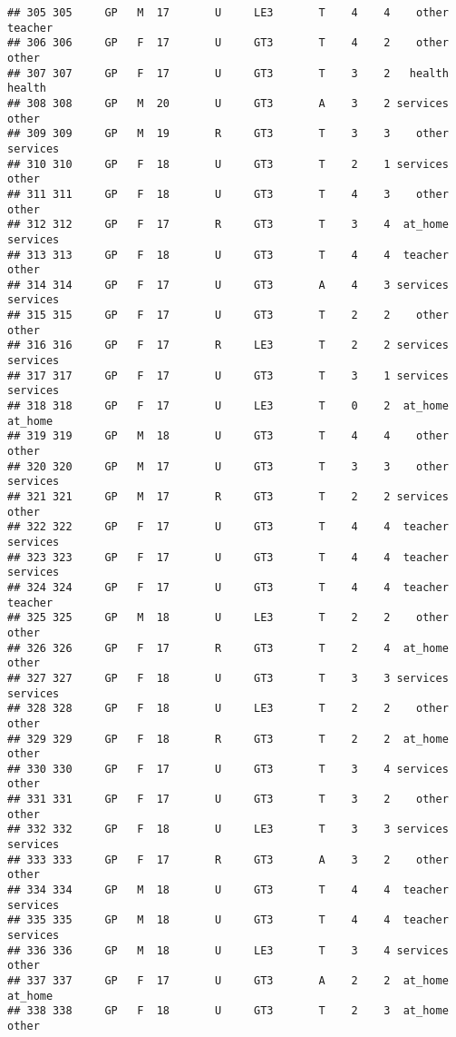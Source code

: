 \documentclass[]{article}
\begin{document}
\begin{verbatim}
## 305 305     GP   M  17       U     LE3       T    4    4    other  teacher
## 306 306     GP   F  17       U     GT3       T    4    2    other    other
## 307 307     GP   F  17       U     GT3       T    3    2   health   health
## 308 308     GP   M  20       U     GT3       A    3    2 services    other
## 309 309     GP   M  19       R     GT3       T    3    3    other services
## 310 310     GP   F  18       U     GT3       T    2    1 services    other
## 311 311     GP   F  18       U     GT3       T    4    3    other    other
## 312 312     GP   F  17       R     GT3       T    3    4  at_home services
## 313 313     GP   F  18       U     GT3       T    4    4  teacher    other
## 314 314     GP   F  17       U     GT3       A    4    3 services services
## 315 315     GP   F  17       U     GT3       T    2    2    other    other
## 316 316     GP   F  17       R     LE3       T    2    2 services services
## 317 317     GP   F  17       U     GT3       T    3    1 services services
## 318 318     GP   F  17       U     LE3       T    0    2  at_home  at_home
## 319 319     GP   M  18       U     GT3       T    4    4    other    other
## 320 320     GP   M  17       U     GT3       T    3    3    other services
## 321 321     GP   M  17       R     GT3       T    2    2 services    other
## 322 322     GP   F  17       U     GT3       T    4    4  teacher services
## 323 323     GP   F  17       U     GT3       T    4    4  teacher services
## 324 324     GP   F  17       U     GT3       T    4    4  teacher  teacher
## 325 325     GP   M  18       U     LE3       T    2    2    other    other
## 326 326     GP   F  17       R     GT3       T    2    4  at_home    other
## 327 327     GP   F  18       U     GT3       T    3    3 services services
## 328 328     GP   F  18       U     LE3       T    2    2    other    other
## 329 329     GP   F  18       R     GT3       T    2    2  at_home    other
## 330 330     GP   F  17       U     GT3       T    3    4 services    other
## 331 331     GP   F  17       U     GT3       T    3    2    other    other
## 332 332     GP   F  18       U     LE3       T    3    3 services services
## 333 333     GP   F  17       R     GT3       A    3    2    other    other
## 334 334     GP   M  18       U     GT3       T    4    4  teacher services
## 335 335     GP   M  18       U     GT3       T    4    4  teacher services
## 336 336     GP   M  18       U     LE3       T    3    4 services    other
## 337 337     GP   F  17       U     GT3       A    2    2  at_home  at_home
## 338 338     GP   F  18       U     GT3       T    2    3  at_home    other

\end{verbatim}
\end{document}

